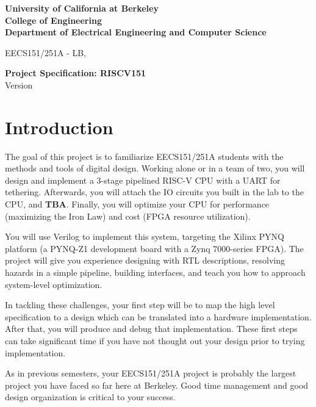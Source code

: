 \documentclass[11pt]{article}
\begin{document}
\begin{center}
{\bf
University of California at Berkeley \\
College of Engineering \\
Department of Electrical Engineering and Computer Science \\
}
\end{center}

\begin{center}
EECS151/251A - LB, \currentSemester
\end{center}

\begin{center}
\LARGE
{\bf Project Specification: RISCV151 }  \\
Version \projectSpecVersion
\end{center}

\tableofcontents

\newpage

\section{Introduction}
The goal of this project is to familiarize EECS151/251A students with the methods and tools of digital design.
Working alone or in a team of two, you will design and implement a 3-stage pipelined RISC-V CPU with a UART for tethering.
Afterwards, you will attach the IO circuits you built in the lab to the CPU, and \textbf{TBA}.
Finally, you will optimize your CPU for performance (maximizing the Iron Law) and cost (FPGA resource utilization).

You will use Verilog to implement this system, targeting the Xilinx PYNQ platform (a PYNQ-Z1 development board with a Zynq 7000-series FPGA).
The project will give you experience designing with RTL descriptions, resolving hazards in a simple pipeline, building interfaces, and teach you how to approach system-level optimization.

In tackling these challenges, your first step will be to map the high level specification to a design which can be translated into a hardware implementation.
After that, you will produce and debug that implementation.
These first steps can take significant time if you have not thought out your design prior to trying implementation.

As in previous semesters, your EECS151/251A project is probably the largest project you have faced so far here at Berkeley.
Good time management and good design organization is critical to your success.
\end{document}
